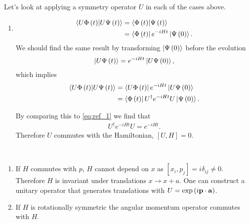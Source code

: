 Let's look at applying a symmetry operator $U$ in each of the cases above.

\begin{enumerate}[label=\alph*)]
    \item
        \begin{align}
            \bra{U \Phi \left( t \right) } \ket{U \Psi \left( t \right) } &= \bra{\Phi \left( t \right) } \ket{\Psi \left( t \right) } \\
                                                                          &= \bra{\Phi\left( t \right) } e^{-i H t} \ket{\Psi \left( 0 \right) }. \label{eq:ref_1}
        \end{align}
        We should find the same result by transforming $\ket{\Psi \left( 0 \right) }$ before the evolution
        \begin{align}
            \ket{U \Psi \left( t \right) } = e^{-i H t} \ket{U \Psi \left( 0 \right) }
        ,\end{align}
        which implies
        \begin{align}
            \bra{U \Phi\left( t \right) } \ket{U \Psi \left( t \right) } &= \bra{U \Phi \left( t \right) } e^{-i H t} \ket{U \Psi \left( 0 \right) } \\
            &= \bra{\Phi\left( t \right) } U^{\dag} e^{-i H t} U \ket{\Psi \left( 0 \right) } 
        .\end{align}

        By comparing this to \cref{eq:ref_1} we find that
        \begin{align}
            U^{\dag} e^{-i H t} U = e^{-i H t}
        .\end{align}
        Therefore $U$ commutes with the Hamiltonian, $\left[ U, H \right] = 0$.
\end{enumerate}

\begin{examples}~
    \begin{enumerate}[label=\arabic*)]
        \item If $H$ commutes with $p$, $H$ cannot depend on $x$ as $\left[ x_{i}, p_{j} \right] = i \delta_{ij} \neq 0$. Therefore $H$ is invariant under translations $x \to x + a$. One can construct a unitary operator that generates translations with $U = \exp \left( i \vb{p} \cdot \vb{a} \right) $.
        \item If $H$ is rotationally symmetric the angular momentum operator commutes with $H$.
    \end{enumerate}
\end{examples}

